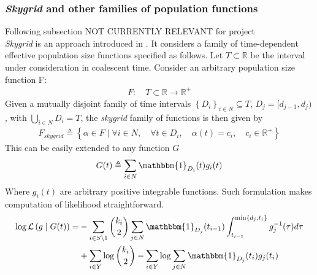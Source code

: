 \documentclass{report}
\newcommand{\R}{\mathbb{R}}
\theoremstyle{definition}
\begin{document}
\subsubsection{\textit{Skygrid} and other families of population functions}
\colorbox{BurntOrange}{Following subsection NOT CURRENTLY RELEVANT for project}\\
\textit{Skygrid} is an approach introduced in \cite{gill_improving_2013}. It considers a family of time-dependent effective population size functions specified as follows. Let $T\subset\R$ be the interval under consideration in coalescent time. Consider an arbitrary population size function F:
\begin{gather}
  F:\quad T\subset\R \rightarrow \R^+
\end{gather}
Given a mutually disjoint family of time intervals $\left\{D_i\right\}_{i\in N}\subseteq T$, $D_j = [d_{j-1}, d_{j})$,  with $\bigcup\limits_{i\in N} D_i = T$, the \textit{skygrid} family of functions is then given by 
\begin{gather}
F_{skygrid}\triangleq\left\{\alpha\in F\mid\forall i\in N,\quad \forall t \in D_i,\quad \alpha(t) = c_i,\quad c_i\in\R^+\right\}
\end{gather}
This can be easily extended to any function $G$
\begin{gather}
 G(t)\triangleq\sum_{i\in N}{\mathbbm{1}_{D_i}(t)g_i(t)}
\end{gather}
Where $g_i(t)$ are arbitrary positive integrable functions.
Such formulation makes computation of likelihood straightforward.
\begin{gather}
\begin{aligned}
\log\mathcal{L}\left(g\mid G(t)\right) 
=& -\sum_{i\in S\setminus 1}{
\binom{k_i}{2}\sum_{j\in N}{\mathbbm{1}_{D_j}(t_{i-1})
\int_{t_{i-1}}^{\min\{d_j, t_i\}}{g^{-1}_j(\tau)d\tau}}}\\
&+\sum_{i\in Y}{\log\binom{k_i}{2}} - \sum_{i\in Y}{\log{\sum_{j\in N}{\mathbbm{1}_{D_j}(t_i)g_j(t_i)}}}
\end{aligned}
\end{gather}
\end{document}
